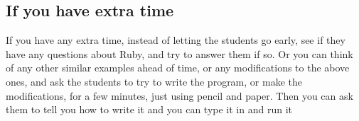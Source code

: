 \documentclass[12pt]{article}
\begin{document}
      \vspace{-2.5mm}

    \subsection{If you have extra time}

      If you have any extra time, instead of letting the students go early,
    see if they have any questions about Ruby, and try to answer them if so.
    Or you can think of any other similar examples ahead of time, or any
    modifications to the above ones, and ask the students to try to write
    the program, or make the modifications, for a few minutes, just using
    pencil and paper.  Then you can ask them to tell you how to write it and
    you can type it in and run it
\end{document}
